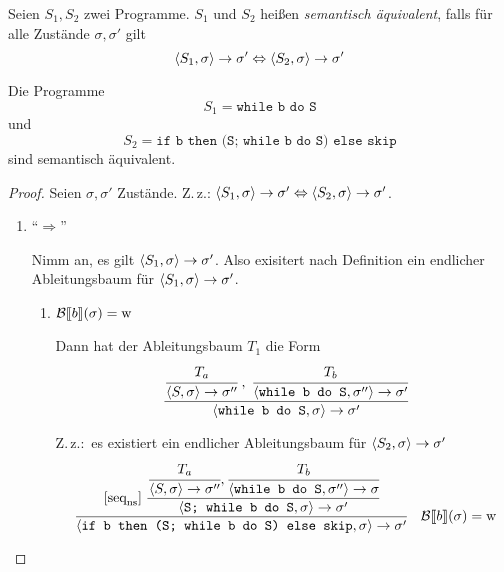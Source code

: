 \begin{definition}
    Seien $S_1, S_2$ zwei Programme. $S_1$ und $S_2$ heißen \emph{semantisch äquivalent}, falls für alle Zustände $\sigma, \sigma'$ gilt
    \[
    \langle S_1, \sigma \rangle \to \sigma' \Leftrightarrow \langle S_2, \sigma \rangle \to \sigma'
    \]
\end{definition}

\begin{example}
    Die Programme
    \[
    S_1 = \texttt{while b do S}
    \]
    und
    \[
    S_2 = \texttt{if b then (S; while b do S) else skip}
    \]
    sind semantisch äquivalent.
\end{example}
\begin{proof}
    Seien $\sigma, \sigma'$ Zustände. Z.\,z.: $\langle S_1, \sigma \rangle \to \sigma' \Leftrightarrow \langle S_2, \sigma \rangle \to \sigma'$.

    \begin{enumerate}
        \item ``$\Rightarrow$''

            Nimm an, es gilt $\langle S_1, \sigma \rangle \to \sigma'$. Also exisitert nach Definition ein endlicher Ableitungsbaum für $\langle S_1, \sigma \rangle \to \sigma'$.
            \begin{enumerate}
                \item $\mathcal{B}\mathrm{[}\kern-.14em\mathrm{[} b\mathrm{]}\kern-.14em\mathrm{]}(\sigma) = \operatorname{w}$

                    Dann hat der Ableitungsbaum $T_1$ die Form
                    \begin{align*}
                        [\text{while}_{\text{ns}}^{\true}]\;
                        \cfrac{
                            \cfrac{T_a}{\strans{S}{\sigma}{\sigma''}}
                            \;,\;
                            \cfrac{T_b}{\strans{\texttt{while b do S}}{\sigma''}{\sigma'}}
                        }{
                            \strans{\texttt{while b do S}}{\sigma}{\sigma'}
                        }
                    \end{align*}

                    Z.\,z.:\ es existiert ein endlicher Ableitungsbaum für $\langle S_2, \sigma \rangle \to \sigma'$
                    \begin{align*}
                        [\text{if}_{\text{ns}}^{\true}]\;
                        \cfrac{
                            [\text{seq}_{\text{ns}}]\;
                            \cfrac{
                                \cfrac{T_a}{\strans{S}{\sigma}{\sigma''}}
                                ,
                                \cfrac{T_b}{\strans{\texttt{while b do S}}{\sigma''}{\sigma}}
                            }{
                                \strans{\texttt{S; while b do S}}{\sigma}{\sigma'}
                            }
                        }{
                            \strans{\texttt{if b then (S; while b do S) else skip}}{\sigma}{\sigma'}
                        }
                        \quad
                        \Bsem{b}(\sigma) = \true
                    \end{align*}


\end{enumerate}
\end{enumerate}
\end{proof}
